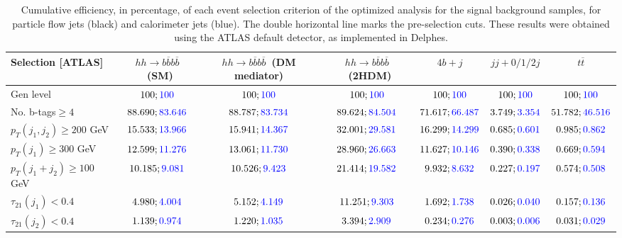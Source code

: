 \begin{landscape}
	\begin{table}
		\centering
		\caption{Cumulative efficiency, in percentage, of each event selection criterion of the optimized analysis for the signal background samples, for particle flow jets (black) and calorimeter jets (blue). The double horizontal line marks the pre-selection cuts. These results were obtained using the ATLAS default detector, as implemented in Delphes.}
		\begin{tabular}{lcccccc}
			\toprule 
			\textbf{Selection [ATLAS]} & $hh\rightarrow b\overline{b}b\overline{b}$~(SM) & $hh\rightarrow b\overline{b}b\overline{b}$~(DM mediator) & $hh\rightarrow b\overline{b}b\overline{b}$~(2HDM) & $4b+j$  & $jj+0/1/2 j$ & $t\overline{t}$ \\
			\midrule
			Gen level & $100;\textcolor{blue}{100}$ & $100;\textcolor{blue}{100}$ &$100;\textcolor{blue}{100}$& $100;\textcolor{blue}{100}$& $100;\textcolor{blue}{100}$& $100;\textcolor{blue}{100}$ \\
			\rowcolor{black!7}No. b-tags$\geq 4$&$88.690;\textcolor{blue}{83.646}$&$88.787;\textcolor{blue}{83.734}$&$89.624;\textcolor{blue}{84.504}$&$71.617;\textcolor{blue}{66.487}$&$3.749;\textcolor{blue}{3.354}$&$51.782;\textcolor{blue}{46.516}$\\
			$p_T(j_1,j_2)\geq200$ GeV & $15.533;\textcolor{blue}{13.966}$ & $15.941;\textcolor{blue}{14.367}$&$32.001;\textcolor{blue}{29.581}$ &$16.299;\textcolor{blue}{14.299}$&$0.685;\textcolor{blue}{0.601}$&$0.985;\textcolor{blue}{0.862}$\\ 
			\midrule \midrule
			\rowcolor{black!7}$p_T(j_1)\geq 300$ GeV & $12.599;\textcolor{blue}{11.276}$ &$13.061;\textcolor{blue}{11.730}$  &$28.960;\textcolor{blue}{26.663}$&$11.627;\textcolor{blue}{10.146}$&$0.390;\textcolor{blue}{0.338}$&$0.669;\textcolor{blue}{0.594}$\\ 
			$p_T(j_1+j_2)\geq 100$ GeV &$10.185;\textcolor{blue}{9.081}$ & $10.526;\textcolor{blue}{9.423}$ &$21.414;\textcolor{blue}{19.582}$&$9.932;\textcolor{blue}{8.632}$&$0.227;\textcolor{blue}{0.197}$&$0.574;\textcolor{blue}{0.508}$\\
			\rowcolor{black!7}$\tau_{21}(j_1)<0.4$ & $4.980;\textcolor{blue}{4.004}$& $5.152;\textcolor{blue}{4.149}$&$11.251;\textcolor{blue}{9.303}$&$1.692;\textcolor{blue}{1.738}$&$0.026;\textcolor{blue}{0.040}$&$0.157;\textcolor{blue}{0.136}$\\
			$\tau_{21}(j_2)<0.4$ &$1.139;\textcolor{blue}{0.974}$ &$1.220;\textcolor{blue}{1.035}$ &$3.394;\textcolor{blue}{2.909}$&$0.234;\textcolor{blue}{0.276}$&$0.003;\textcolor{blue}{0.006}$&$0.031;\textcolor{blue}{0.029}$\\

\end{tabular}
\end{table}
\end{landscape}
